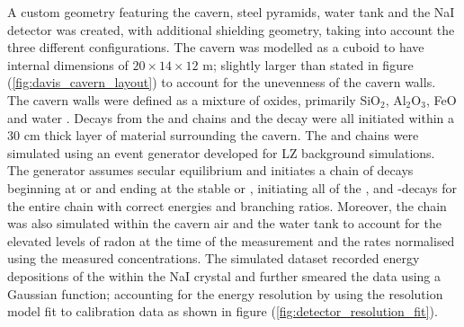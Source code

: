 A custom geometry featuring the cavern, steel pyramids, water tank and the NaI detector was created, with additional shielding geometry, taking into account the three different configurations. The cavern was modelled as a cuboid to have internal dimensions of $20 \times 14 \times 12$ m; slightly larger than stated in figure (\ref{fig:davis_cavern_layout}) to account for the unevenness of the cavern walls. The cavern walls were defined as a mixture of oxides, primarily SiO$_{2}$, Al$_{2}$O$_{3}$, FeO and water \cite{Mei_2010}. Decays from the \UTTE{} and \ThTTT{} chains and the \KFZ{} decay were all initiated within a 30 cm thick layer of material surrounding the cavern. The \UTTE{} and \ThTTT{} chains were simulated using an event generator developed for LZ background simulations. The generator assumes secular equilibrium and initiates a chain of decays beginning at \UTTE{} or \ThTTT{} and ending at the stable \PbTZS{} or \PbTZE{}, initiating all of the \alpha, \beta and \gamma-decays for the entire chain with correct  energies and branching ratios. Moreover, the \RnTTT{} chain was also simulated within the cavern air and the water tank to account for the elevated levels of radon at the time of the measurement and the rates normalised using the measured concentrations. The simulated dataset recorded energy depositions of the \grays{} within the NaI crystal and further smeared the data using a Gaussian function; accounting for the energy resolution by using the resolution model fit to calibration data as shown in figure (\ref{fig:detector_resolution_fit}).

